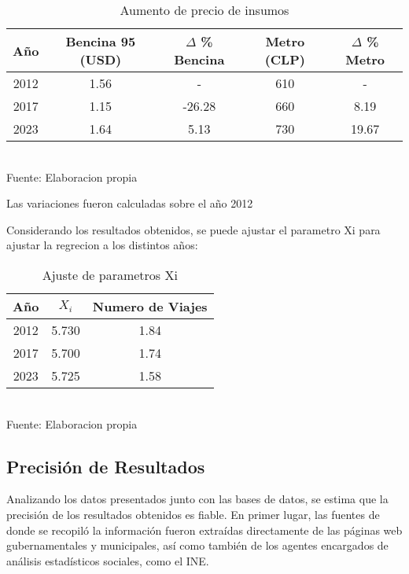 \documentclass[12pt]{article} %
\begin{document}
\begin{table}[H]
    \centering
    \caption{Aumento de precio de insumos}
    \vspace{0.2cm}
    \begin{tabular}{|c|c|c|c|c|}
        \hline
        Año &  Bencina 95 (USD) & $\Delta$ \% Bencina & Metro (CLP) & $\Delta$ \% Metro\\
        \hline
        2012 &  1.56  & - & 610 & - \\
        2017 &  1.15 & -26.28 & 660 & 8.19\\
        2023 &  1.64 & 5.13 & 730 & 19.67\\
        \hline
    \end{tabular}
    \vspace{0.2cm}
    \\Fuente: Elaboracion propia
\end{table}


Las variaciones fueron calculadas sobre el año 2012


Considerando los resultados obtenidos, se puede ajustar el parametro Xi para ajustar la regrecion a los distintos años:

\begin{table}[H]
    \centering
    \caption{Ajuste de parametros Xi}
    \vspace{0.2cm}
    \begin{tabular}{|c|c|c|}
        \hline
        Año & $X_i$ & Numero de Viajes \\
        \hline
        2012 & 5.730 & 1.84 \\
        2017 & 5.700 & 1.74 \\
        2023 & 5.725 & 1.58 \\
        \hline
    \end{tabular}
    \vspace{0.2cm}
    \\Fuente: Elaboracion propia
\end{table}


\subsection{Precisión de Resultados}
Analizando los datos presentados junto con las bases de datos, se estima que la precisión de los resultados obtenidos es fiable.
En primer lugar, las fuentes de donde se recopiló la información fueron extraídas directamente de las páginas web gubernamentales y municipales, 
así como también de los agentes encargados de análisis estadísticos sociales, como el INE.\\ 
\end{document}
